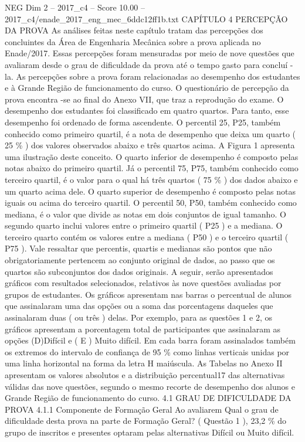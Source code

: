 \begin{textsample}{NEG Dim 2 – 2017\_c4 – Score 10.00 – 2017\_c4/enade\_2017\_eng\_mec\_6ddc12ff1b.txt}  \label{ex:f2_neg_342}
CAPÍTULO 4 PERCEPÇÃO DA PROVA As análises feitas neste capítulo tratam das percepções dos concluintes da Área de Engenharia Mecânica sobre a prova aplicada no Enade/2017.
Essas percepções foram mensuradas por meio de nove questões que avaliaram desde o grau de dificuldade da prova até o tempo gasto para concluí -la.
As percepções sobre a prova foram relacionadas ao desempenho dos estudantes e à Grande Região de funcionamento do curso.
O questionário de percepção da prova encontra -se ao final do Anexo VII, que traz a reprodução do exame.
O desempenho dos estudantes foi classificado em quatro quartos.
Para tanto, esse desempenho foi ordenado de forma ascendente.
O percentil 25, P25, também conhecido como primeiro quartil, é a nota de desempenho que deixa um quarto ( 25 \% ) dos valores observados abaixo e três quartos acima.
A Figura 1 apresenta uma ilustração deste conceito.
O quarto inferior de desempenho é composto pelas notas abaixo do primeiro quartil.
Já o percentil 75, P75, também conhecido como terceiro quartil, é o valor para o qual há três quartos ( 75 \% ) dos dados abaixo e um quarto acima dele.
O quarto superior de desempenho é composto pelas notas iguais ou acima do terceiro quartil.
O percentil 50, P50, também conhecido como mediana, é o valor que divide as notas em dois conjuntos de igual tamanho.
O segundo quarto inclui valores entre o primeiro quartil ( P25 ) e a mediana.
O terceiro quarto contém os valores entre a mediana ( P50 ) e o terceiro quartil ( P75 ).
Vale ressaltar que percentis, quartis e medianas são pontos que não obrigatoriamente pertencem ao conjunto original de dados, ao passo que os quartos são subconjuntos dos dados originais.
A seguir, serão apresentados gráficos com resultados selecionados, relativos às nove questões avaliadas por grupos de estudantes.
Os gráficos apresentam nas barras o percentual de alunos que assinalaram uma das opções ou a soma das porcentagens daqueles que assinalaram duas ( ou três ) delas.
Por exemplo, para as questões 1 e 2, os gráficos apresentam a porcentagem total de participantes que assinalaram as opções (D)Difícil e ( E ) Muito difícil.
Em cada barra foram assinalados também os extremos do intervalo de confiança de 95 \% como linhas verticais unidas por uma linha horizontal na forma da letra H maiúscula.
As Tabelas no Anexo II apresentam os valores absolutos e a distribuição percentual17 das alternativas válidas das nove questões, segundo o mesmo recorte de desempenho dos alunos e Grande Região de funcionamento do curso. 4.1 GRAU DE DIFICULDADE DA PROVA 4.1.1 Componente de Formação Geral Ao avaliarem Qual o grau de dificuldade desta prova na parte de Formação Geral? ( Questão 1 ), 23,2 \% do grupo de inscritos e presentes optaram pelas alternativas Difícil ou Muito difícil.

\end{textsample}
